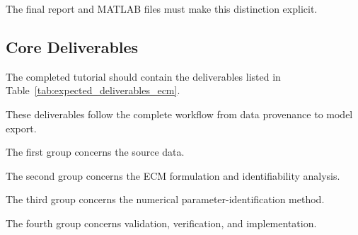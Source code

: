 \documentclass[a4paper,12pt]{article}
\begin{document}
The final report and MATLAB files must make this distinction explicit.

\subsection{Core Deliverables}

The completed tutorial should contain the deliverables listed in Table~\ref{tab:expected_deliverables_ecm}.

These deliverables follow the complete workflow from data provenance to model export.

The first group concerns the source data.

The second group concerns the ECM formulation and identifiability analysis.

The third group concerns the numerical parameter-identification method.

The fourth group concerns validation, verification, and implementation.
\end{document}
